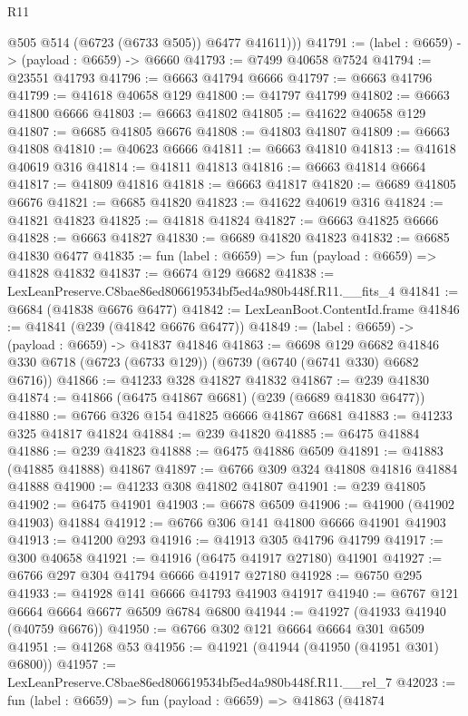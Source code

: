 \begin{lexlean}{R11}
\begin{coremodule}
          @505
          @514
          (@6723 (@6733 @505))
          @6477
          @41611)))
@41791 := (label : @6659) -> (payload : @6659) -> @6660
@41793 := @7499 @40658 @7524
@41794 := @23551 @41793
@41796 := @6663 @41794 @6666
@41797 := @6663 @41796
@41799 := @41618 @40658 @129
@41800 := @41797 @41799
@41802 := @6663 @41800 @6666
@41803 := @6663 @41802
@41805 := @41622 @40658 @129
@41807 := @6685 @41805 @6676
@41808 := @41803 @41807
@41809 := @6663 @41808
@41810 := @40623 @6666
@41811 := @6663 @41810
@41813 := @41618 @40619 @316
@41814 := @41811 @41813
@41816 := @6663 @41814 @6664
@41817 := @41809 @41816
@41818 := @6663 @41817
@41820 := @6689 @41805 @6676
@41821 := @6685 @41820
@41823 := @41622 @40619 @316
@41824 := @41821 @41823
@41825 := @41818 @41824
@41827 := @6663 @41825 @6666
@41828 := @6663 @41827
@41830 := @6689 @41820 @41823
@41832 := @6685 @41830 @6477
@41835 := fun (label : @6659) => fun (payload : @6659) => @41828 @41832
@41837 := @6674 @129 @6682
@41838 := LexLeanPreserve.C8bae86ed806619534bf5ed4a980b448f.R11.__fits_4
@41841 := @6684 (@41838 @6676 @6477)
@41842 := LexLeanBoot.ContentId.frame
@41846 := @41841 (@239 (@41842 @6676 @6477))
@41849 := (label : @6659) -> (payload : @6659) -> @41837 @41846
@41863 := @6698
    @129
    @6682
    @41846
    @330
    @6718
    (@6723 (@6733 @129))
    (@6739 (@6740 (@6741 @330) @6682 @6716))
@41866 := @41233 @328 @41827 @41832
@41867 := @239 @41830
@41874 := @41866 (@6475 @41867 @6681) (@239 (@6689 @41830 @6477))
@41880 := @6766 @326 @154 @41825 @6666 @41867 @6681
@41883 := @41233 @325 @41817 @41824
@41884 := @239 @41820
@41885 := @6475 @41884
@41886 := @239 @41823
@41888 := @6475 @41886 @6509
@41891 := @41883 (@41885 @41888) @41867
@41897 := @6766 @309 @324 @41808 @41816 @41884 @41888
@41900 := @41233 @308 @41802 @41807
@41901 := @239 @41805
@41902 := @6475 @41901
@41903 := @6678 @6509
@41906 := @41900 (@41902 @41903) @41884
@41912 := @6766 @306 @141 @41800 @6666 @41901 @41903
@41913 := @41200 @293
@41916 := @41913 @305 @41796 @41799
@41917 := @300 @40658
@41921 := @41916 (@6475 @41917 @27180) @41901
@41927 := @6766 @297 @304 @41794 @6666 @41917 @27180
@41928 := @6750 @295
@41933 := @41928 @141 @6666 @41793 @41903 @41917
@41940 := @6767 @121 @6664 @6664 @6677 @6509 @6784 @6800
@41944 := @41927 (@41933 @41940 (@40759 @6676))
@41950 := @6766 @302 @121 @6664 @6664 @301 @6509
@41951 := @41268 @53
@41956 := @41921 (@41944 (@41950 (@41951 @301) @6800))
@41957 := LexLeanPreserve.C8bae86ed806619534bf5ed4a980b448f.R11.__rel_7
@42023 := fun (label : @6659) =>
  fun (payload : @6659) =>
  @41863
    (@41874

\end{coremodule}
\end{lexlean}
